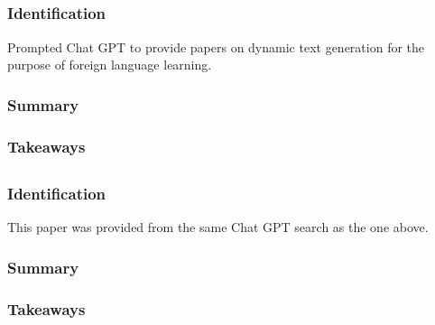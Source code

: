 \documentclass[
	letterpaper, %
]{jdf}
\begin{document}
\subsection{}
\subsubsection{Identification}
Prompted Chat GPT to provide papers on dynamic text generation for the purpose of foreign language learning.

\subsubsection{Summary}

\subsubsection{Takeaways}

\subsection{}
\subsubsection{Identification}
This paper was provided from the same Chat GPT search as the one above.

\subsubsection{Summary}

\subsubsection{Takeaways}
\end{document}
